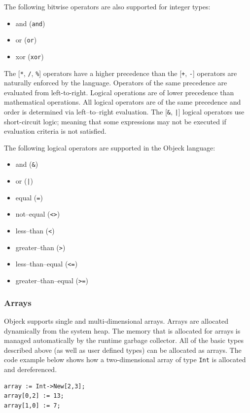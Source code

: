\documentclass[12pt]{article}
\begin{document}
The following bitwise operators are also supported for integer types:
\begin{itemize}
\item and (\texttt{and})
\item or (\texttt{or})
\item xor (\texttt{xor})
\end{itemize}

The [\texttt{*}, \texttt{/}, \texttt{\%}] operators have a higher
precedence than the [\texttt{+}, \texttt{-}] operators are naturally
enforced by the language. Operators of the same precedence are
evaluated from left-to-right.  Logical operations are of lower
precedence than mathematical operations. All logical operators are of
the same precedence and order is determined via left--to--right
evaluation.  The [\texttt{\&}, \texttt{|}] logical operators use
short-circuit logic; meaning that some expressions may not be executed
if evaluation criteria is not satisfied.

The following logical operators are supported in the Objeck language:
\begin{itemize}
\item and (\texttt{\&})
\item or (\texttt{|})
\item equal (\texttt{=})
\item not--equal (\texttt{<>})
\item less--than (\texttt{<})
\item greater--than (\texttt{>})
\item less--than--equal (\texttt{<=})
\item greater--than--equal (\texttt{>=})
\end{itemize}

\subsubsection{Arrays}
Objeck supports single and multi-dimensional arrays.  Arrays are
allocated dynamically from the system heap.  The memory that is
allocated for arrays is managed automatically by the runtime garbage
collector.  All of the basic types described above (as well as user
defined types) can be allocated as arrays.  The code example below
shows how a two-dimensional array of type \texttt{Int} is allocated
and dereferenced.


\begin{verbatim}
array := Int->New[2,3];
array[0,2] := 13;
array[1,0] := 7;
\end{verbatim}
\end{document}

